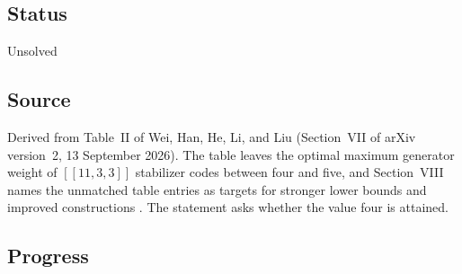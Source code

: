 \subsection*{Status}

Unsolved

\subsection*{Source}

Derived from Table~II of Wei, Han, He, Li, and Liu (Section~VII of arXiv version~2, 13 September 2026). The table leaves the optimal maximum generator weight of $[[11,3,3]]$ stabilizer codes between four and five, and Section~VIII names the unmatched table entries as targets for stronger lower bounds and improved constructions . The statement asks whether the value four is attained.

\subsection*{Progress}

